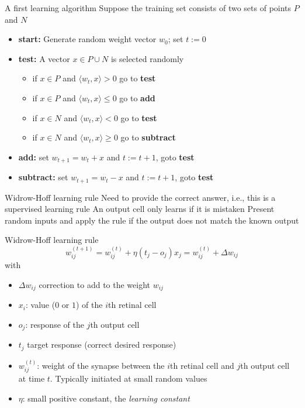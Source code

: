 \documentclass[aspectratio=169]{beamer}\usepackage[]{graphicx}\usepackage[]{xcolor}
\begin{document}
\begin{frame}{A first learning algorithm}
    Suppose the training set consists of two sets of points $P$ and $N$
    \vfill
    \begin{itemize}
        \item \textbf{start:} Generate random weight vector $w_0$; set $t := 0$
        \vfill
        \item \textbf{test:} A vector $x\in P\cup N$ is selected randomly
        \begin{itemize}
            \item if $x\in P$ and $\langle w_t,x\rangle > 0$ go to \textbf{test}
            \item if $x\in P$ and $\langle w_t,x\rangle\leq 0$ go to \textbf{add}
            \item if $x\in N$ and $\langle w_t,x\rangle < 0$ go to \textbf{test}
            \item if $x\in N$ and $\langle w_t,x\rangle \geq 0$ go to \textbf{subtract}
        \end{itemize}
        \vfill
        \item \textbf{add:} set $w_{t+1} = w_t + x$ and $t := t + 1$, goto \textbf{test}
        \vfill
        \item \textbf{subtract:} set $w_{t+1} = w_t - x$ and $t := t + 1$, goto \textbf{test}
    \end{itemize}
\end{frame}



\begin{frame}{Widrow-Hoff learning rule}
    Need to provide the correct answer, i.e., this is a supervised learning rule
    \vfill
    An output cell only learns if it is mistaken
    \vfill
    Present random inputs and apply the rule if the output does not match the known output
\end{frame}

\begin{frame}{Widrow-Hoff learning rule}
    \begin{equation}\label{eq:WidrowHoff}
        w_{ij}^{(t+1)} = w_{ij}^{(t)}+\eta(t_j-o_j)x_j = w_{ij}^{(t)}+\Delta w_{ij}        
    \end{equation}
    with
    \begin{itemize}
        \item $\Delta w_{ij}$ correction to add to the weight $w_{ij}$
        \item $x_i$: value ($0$ or $1$) of the $i$th retinal cell
        \item $o_j$: response of the $j$th output cell
        \item $t_j$ target response (correct desired response)
        \item $w_{ij}^{(t)}$: weight of the synapse between the $i$th retinal cell and $j$th output cell at time $t$. Typically initiated at small random values
        \item $\eta$: small positive constant, the \emph{learning constant}
    \end{itemize} 
\end{frame}
\end{document}
